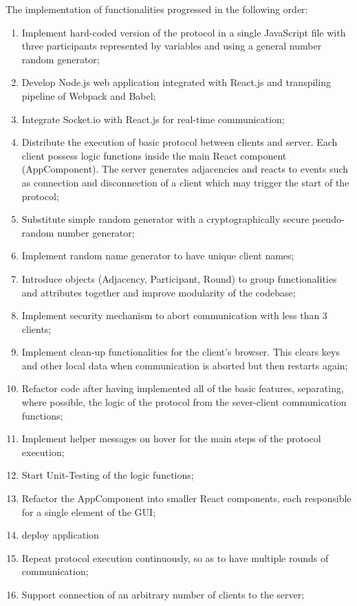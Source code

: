 The implementation of functionalities progressed in the following order:
\begin{enumerate}
    \item Implement hard-coded version of the protocol in a single JavaScript file with three participants represented by variables and using a general number random generator;
    \item Develop Node.js web application integrated with React.js and transpiling pipeline of Webpack and Babel;
    \item Integrate Socket.io with React.js for real-time communication;
    \item Distribute the execution of basic protocol between clients and server. Each client possess logic functions inside the main React component (AppComponent). The server generates adjacencies and reacts to events such as connection and disconnection of a client which may trigger the start of the protocol;
    \item Substitute simple random generator with a cryptographically secure pseudo-random number generator;
    \item Implement random name generator to have unique client names;
    \item Introduce objects (Adjacency, Participant, Round) to group functionalities and attributes together and improve modularity of the codebase;
    \item Implement security mechanism to abort communication with less than 3 clients;
    \item Implement clean-up functionalities for the client's browser. This clears keys and other local data when communication is aborted but then restarts again;
    \item Refactor code after having implemented all of the basic features, separating, where possible, the logic of the protocol from the sever-client communication functions;
    \item Implement helper messages on hover for the main steps of the protocol execution;
    \item Start Unit-Testing of the logic functions;
    \item Refactor the AppComponent into smaller React components, each responsible for a single element of the GUI;
    \item deploy application 
    \item Repeat protocol execution continuously, so as to have multiple rounds of communication;
    \item Support connection of an arbitrary number of clients to the server;

\end{enumerate}
